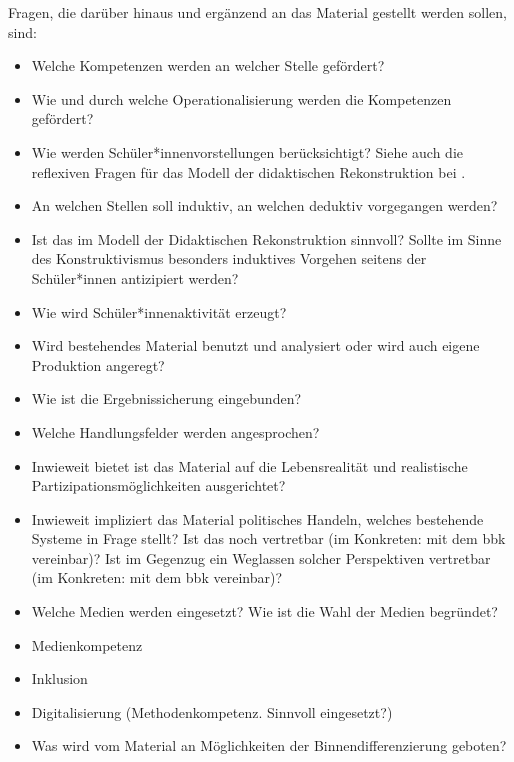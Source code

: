 Fragen, die darüber hinaus und ergänzend an das Material gestellt werden sollen, sind:
\begin{itemize}
    \item Welche Kompetenzen werden an welcher Stelle gefördert?
    \item Wie und durch welche Operationalisierung werden die Kompetenzen gefördert?
    \item Wie werden Schüler*innenvorstellungen berücksichtigt? %
    Siehe auch die reflexiven Fragen für das Modell der didaktischen Rekonstruktion bei \textcite[411-412]{Reinfried2009}.
    \item An welchen Stellen soll induktiv, an welchen deduktiv vorgegangen werden?
    \item Ist das im Modell der Didaktischen Rekonstruktion sinnvoll? \autocite[]{Reinfried2009} Sollte im Sinne des Konstruktivismus besonders induktives Vorgehen seitens der Schüler*innen antizipiert werden?
    \item Wie wird Schüler*innenaktivität erzeugt? %
    \item Wird bestehendes Material benutzt und analysiert oder wird auch eigene Produktion angeregt?
    \item Wie ist die Ergebnissicherung eingebunden?
    \item Welche Handlungsfelder werden angesprochen?
    \item Inwieweit bietet ist das Material auf die Lebensrealität und realistische Partizipationsmöglichkeiten ausgerichtet?
    \item Inwieweit impliziert das Material politisches Handeln, welches bestehende Systeme in Frage stellt? Ist das noch vertretbar (im Konkreten: mit dem \gls{bbk} vereinbar)? Ist im Gegenzug ein Weglassen solcher Perspektiven vertretbar (im Konkreten: mit dem \gls{bbk} vereinbar)?
    \item Welche Medien werden eingesetzt? Wie ist die Wahl der Medien begründet?
    \item Medienkompetenz %
    \item Inklusion
    \item Digitalisierung (Methodenkompetenz. Sinnvoll eingesetzt?)
    \item Was wird vom Material an Möglichkeiten der Binnendifferenzierung geboten?

\end{itemize}
